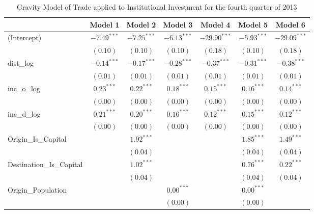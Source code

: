 \begin{table}
	\small
	\begin{center}
		\caption[Gravity Model of trade for Q4 2013]{Gravity Model of Trade applied to Institutional Investment for the fourth quarter of 2013}
		\begin{tabular}{l c c c c c c }
\hline
& Model 1 & Model 2 & Model 3 & Model 4 & Model 5 & Model 6 \\
\hline
(Intercept)                  & $-7.49^{***}$ & $-7.25^{***}$ & $-6.13^{***}$ & $-29.90^{***}$ & $-5.93^{***}$ & $-29.09^{***}$ \\
& $(0.10)$      & $(0.10)$      & $(0.10)$      & $(0.18)$       & $(0.10)$      & $(0.18)$       \\
dist\_log                    & $-0.14^{***}$ & $-0.17^{***}$ & $-0.28^{***}$ & $-0.37^{***}$  & $-0.31^{***}$ & $-0.38^{***}$  \\
& $(0.01)$      & $(0.01)$      & $(0.01)$      & $(0.01)$       & $(0.01)$      & $(0.01)$       \\
inc\_o\_log                  & $0.23^{***}$  & $0.22^{***}$  & $0.18^{***}$  & $0.15^{***}$   & $0.16^{***}$  & $0.14^{***}$   \\
& $(0.00)$      & $(0.00)$      & $(0.00)$      & $(0.00)$       & $(0.00)$      & $(0.00)$       \\
inc\_d\_log                  & $0.21^{***}$  & $0.20^{***}$  & $0.16^{***}$  & $0.12^{***}$   & $0.15^{***}$  & $0.12^{***}$   \\
& $(0.00)$      & $(0.00)$      & $(0.00)$      & $(0.00)$       & $(0.00)$      & $(0.00)$       \\
Origin\_Is\_Capital          &               & $1.92^{***}$  &               &                & $1.85^{***}$  & $1.49^{***}$   \\
&               & $(0.04)$      &               &                & $(0.04)$      & $(0.04)$       \\
Destination\_Is\_Capital     &               & $1.02^{***}$  &               &                & $0.76^{***}$  & $0.22^{***}$   \\
&               & $(0.04)$      &               &                & $(0.04)$      & $(0.04)$       \\
Origin\_Population           &               &               & $0.00^{***}$  &                & $0.00^{***}$  &                \\
&               &               & $(0.00)$      &                & $(0.00)$      &                \\

\end{tabular}
\end{center}
\end{table}
